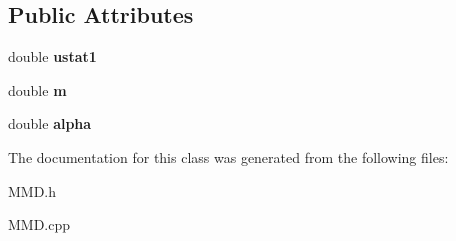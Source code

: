 \subsection*{Public Attributes}
\begin{DoxyCompactItemize}
\item 
double {\bfseries ustat1}\hypertarget{classMMD_a04babcd856518cc0a393f2987bc2f0ab}{}\label{classMMD_a04babcd856518cc0a393f2987bc2f0ab}

\item 
double {\bfseries m}\hypertarget{classMMD_a2ab01d30d080648d1e895daea9019aac}{}\label{classMMD_a2ab01d30d080648d1e895daea9019aac}

\item 
double {\bfseries alpha}\hypertarget{classMMD_a50f0350ede45720e377c7c3122c68bbd}{}\label{classMMD_a50f0350ede45720e377c7c3122c68bbd}

\end{DoxyCompactItemize}


The documentation for this class was generated from the following files\+:\begin{DoxyCompactItemize}
\item 
M\+M\+D.\+h\item 
M\+M\+D.\+cpp\end{DoxyCompactItemize}
